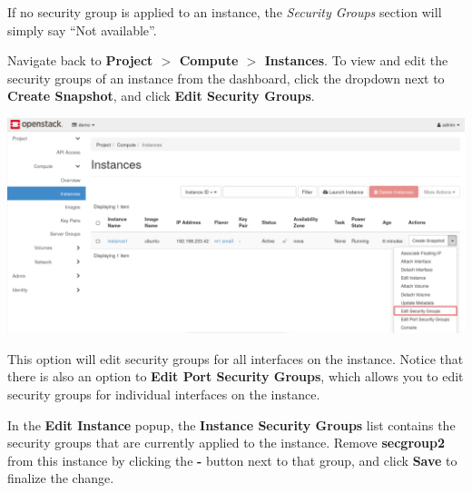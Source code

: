 \documentclass[letterpaper, 12pt]{article}
\begin{document}
\begin{enumerate}
    \begin{notebox}
        If no security group is applied to an instance, the \textit{Security Groups} section will simply say ``Not available''.
    \end{notebox}

    \begin{labstep}\label{it:secgroup}
        Navigate back to \textbf{Project $>$ Compute $>$ Instances}.
        To view and edit the security groups of an instance from the dashboard, click the dropdown next to \textbf{Create Snapshot}, and click \textbf{Edit Security Groups}.

        \begin{center}
            \includegraphics[width=\linewidth]{images/part2/step18.png}
        \end{center}
    \end{labstep}

    \begin{notebox}
        This option will edit security groups for all interfaces on the instance.
        Notice that there is also an option to \textbf{Edit Port Security Groups}, which allows you to edit security groups for individual interfaces on the instance.
    \end{notebox}

    \begin{labstep}
        In the \textbf{Edit Instance} popup, the \textbf{Instance Security Groups} list contains the security groups that are currently applied to the instance.
        Remove \textbf{secgroup2} from this instance by clicking the \textbf{-} button next to that group, and click \textbf{Save} to finalize the change.


\end{labstep}
\end{enumerate}
\end{document}
